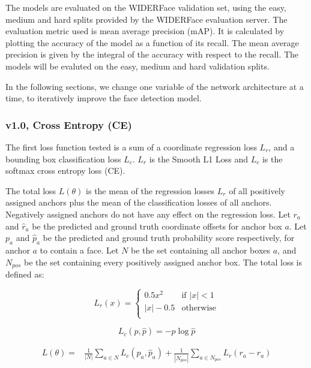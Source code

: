 \documentclass[a4paper, twoside]{article}
\begin{document}
The models are evaluated on the WIDERFace validation set, using the easy, medium and hard splits provided by the WIDERFace evaluation server. The evaluation metric used is mean average precision (mAP). It is calculated by plotting the accuracy of the model as a function of its recall. The mean average precision is given by the integral of the accuracy with respect to the recall. The models will be evaluted on the easy, medium and hard validation splits.

In the following sections, we change one variable of the network architecture at a time, to iteratively improve the face detection model.

\subsubsection{v1.0, Cross Entropy (CE)}
The first loss function tested is a sum of a coordinate regression loss $L_r$, and a bounding box classification loss $L_c$. $L_r$ is the Smooth L1 Loss \cite{cs231n} and $L_c$ is the softmax cross entropy loss (CE).

The total loss $L(\theta)$ is the mean of the regression losses $L_r$ of all positively assigned anchors plus the mean of the classification losses of all anchors. Negatively assigned anchors do not have any effect on the regression loss. Let $r_a$ and $\hat{r}_a$ be the predicted and ground truth coordinate offsets for anchor box $a$. Let $p_a$ and $\hat{p}_a$ be the predicted and ground truth probability score respectively, for anchor $a$ to contain a face. Let $N$ be the set containing all anchor boxes $a$, and $N_{pos}$ be the set containing every positively assigned anchor box. The total loss is defined as:

\begin{equation}\label{eqfocalloss}
L_r(x) = \begin{cases}
				0.5x^2 & \mbox{if } |x| < 1\\
				|x| - 0.5 & \mbox{otherwise}\\
			\end{cases}
\end{equation}

\begin{equation}\label{eqsmoothl1loss}
L_c(p, \hat{p}) = -p \log{\hat{p}}
\end{equation}



\begin{equation}
\begin{split}
	L(\theta) = &  \frac{1}{|N|} \sum_{a \in N} L_c(p_a, \hat{p}_a) 
	 + \frac{1}{|N_{pos}|} \sum_{a \in N_{pos}} L_r(r_a - \hat{r}_a)  \\ 
\end{split}
\end{equation}
\end{document}
